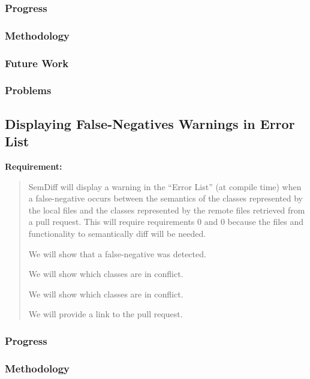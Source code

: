 \documentclass[draftclsnofoot,onecolumn]{IEEEtran}
\begin{document}
\subsubsection{Progress}

\subsubsection{Methodology}

\subsubsection{Future Work}

\subsubsection{Problems}






\subsection{Displaying False-Negatives Warnings in Error List}

\textbf{Requirement:}

\begin{quote}

SemDiff will display a warning in the “Error List” (at compile time) when a false-negative occurs between the semantics of the classes represented by the local files and the classes represented by the remote files retrieved from a pull request. This will require requirements 0 and 0 because the files and functionality to semantically diff will be needed.

We will show that a false-negative was detected.

We will show which classes are in conflict.

We will show which classes are in conflict.

We will provide a link to the pull request.

\end{quote}

\subsubsection{Progress}

\subsubsection{Methodology}
\end{document}
